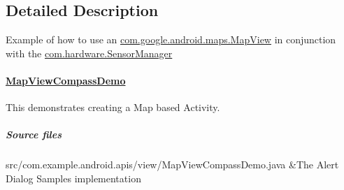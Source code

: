 \subsection{Detailed Description}
Example of how to use an \hyperlink{}{com.\-google.\-android.\-maps.\-Map\-View} in conjunction with the \hyperlink{}{com.\-hardware.\-Sensor\-Manager} \paragraph*{\hyperlink{classcom_1_1example_1_1android_1_1apis_1_1view_1_1_map_view_compass_demo}{Map\-View\-Compass\-Demo}}

This demonstrates creating a Map based Activity.

\subparagraph*{Source files}

\begin{TabularC}{2}
\hline
src/com.\-example.\-android.\-apis/view/\-Map\-View\-Compass\-Demo.java &The Alert Dialog Samples implementation  \\
\end{TabularC}


